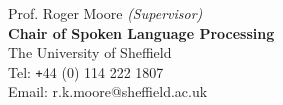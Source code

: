 \documentclass[10pt]{article} %
\begin{document}
\begin{changemargin}{0pt}{0.5pt}
\begin{minipage}[t]{0.44\textwidth}
Prof. Roger Moore \textit{(Supervisor)}\\
\textbf{Chair of Spoken Language Processing}\\
The University of Sheffield\\
Tel: \texttt{+}44 (0) 114 222 1807\\
Email: r.k.moore@sheffield.ac.uk\\


	
	


\end{minipage} %

\end{changemargin}
\end{document}
